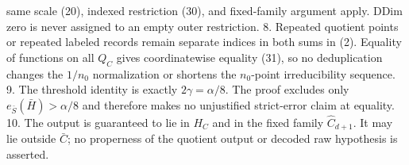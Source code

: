 \begin{proposition}
   same scale (20), indexed restriction (30), and fixed-family argument
   apply. DDim zero is never assigned to an empty outer restriction.
8. Repeated quotient points or repeated labeled records remain separate
   indices in both sums in (2). Equality of functions on all \(Q_C\) gives
   coordinatewise equality (31), so no deduplication changes the
   \(1/n_0\) normalization or shortens the \(n_0\)-point irreducibility
   sequence.
9. The threshold identity is exactly
   \(2\gamma=\alpha/8\). The proof excludes only
   \(e_{\bar S}(\bar H)>\alpha/8\) and therefore makes no unjustified
   strict-error claim at equality.
10. The output is guaranteed to lie in \(H_C\) and in the fixed family
    \(\widehat C_{d+1}\). It may lie outside \(\bar C\); no properness of
    the quotient output or decoded raw hypothesis is asserted.


\end{proposition}

